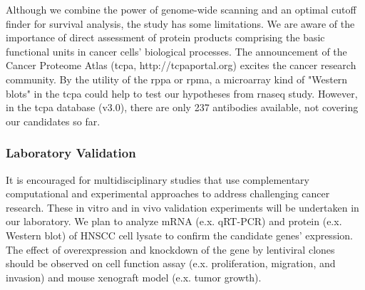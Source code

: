 \documentclass[jpm,article,submit,moreauthors,pdftex]{Definitions/mdpi}
\newenvironment{MyColorPar}[1]{%
    \leavevmode\color{#1}\ignorespaces%
}{%
}%
\begin{document}
\begin{paracol}{2}
Although we combine the power of genome-wide scanning and an optimal cutoff finder for survival analysis, the study has some limitations.
We are aware of the importance of direct assessment of protein products comprising the basic functional units in cancer cells' biological processes. The announcement of the Cancer Proteome Atlas (\acrshort{tcpa}, http://tcpaportal.org) excites the cancer research community\cite{Li2013c}\cite{Li2017b}. By the utility of the \acrfull{rppa} or \acrfull{rpma}, a microarray kind of "Western blots" in the \acrshort{tcpa} could help to test our hypotheses from \acrshort{rnaseq} study.
However, in the \acrshort{tcpa} database (v3.0\cite{Chen2019}), there are only 237 antibodies available, not covering our candidates so far. %



\subsubsection{Laboratory Validation}
It is encouraged for multidisciplinary studies that use complementary computational and experimental approaches to address challenging cancer research.
These in vitro and in vivo validation experiments will be undertaken in our laboratory.
We plan to analyze mRNA (e.x. qRT-PCR) and protein (e.x. Western blot) of HNSCC cell lysate to confirm the candidate genes' expression.
The effect of overexpression and knockdown of the gene by lentiviral clones should be observed on cell function assay (e.x. proliferation, migration, and invasion) and mouse xenograft model (e.x. tumor growth). %


\end{paracol}
\end{document}
